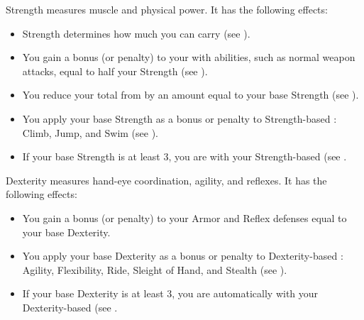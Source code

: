         \label{Strength}
        {
            Strength measures muscle and physical power.
            It has the following effects:
            \begin{itemize}
                \item Strength determines how much you can carry (see ).
                \item You gain a bonus (or penalty) to your  with  abilities, such as normal weapon attacks, equal to half your Strength (see ).
                \item You reduce your total  from  by an amount equal to your base Strength (see ).
                \item You apply your base Strength as a bonus or penalty to Strength-based : Climb, Jump, and Swim (see ).
                \item If your base Strength is at least 3, you are  with your Strength-based  (see .
            \end{itemize}
        }

        \label{Dexterity}
        {
            Dexterity measures hand-eye coordination, agility, and reflexes.
            It has the following effects:
            \begin{itemize}
                \item You gain a bonus (or penalty) to your Armor and Reflex defenses equal to your base Dexterity.
                \item You apply your base Dexterity as a bonus or penalty to Dexterity-based : Agility, Flexibility, Ride, Sleight of Hand, and Stealth (see ).
                \item If your base Dexterity is at least 3, you are automatically  with your Dexterity-based  (see .
            \end{itemize}
        }

